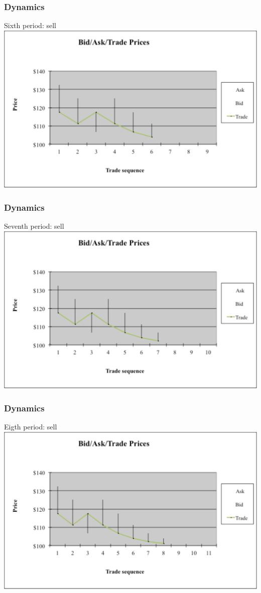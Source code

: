 \begin{frame} [noframenumbering]
	\frametitle{Dynamics}
	Sixth period: sell
	\center
	\includegraphics[width=0.9\linewidth]{pics/P6_Image.pdf}
\end{frame}


\begin{frame} [noframenumbering]
	\frametitle{Dynamics}
	Seventh period: sell
	\center
	\includegraphics[width=0.9\linewidth]{pics/P7_Image.pdf}
\end{frame}


\begin{frame} [noframenumbering]
	\frametitle{Dynamics}
	Eigth period: sell
	\center
	\includegraphics[width=0.9\linewidth]{pics/P8_Image.pdf}
\end{frame}


